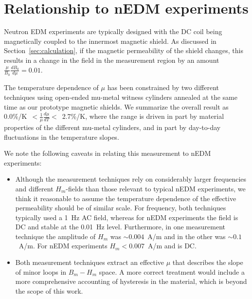 





\section{Relationship to nEDM experiments\label{sec:relationship}}

Neutron EDM experiments are typically designed with the DC coil being
magnetically coupled to the innermost magnetic shield. As discussed in
Section~\ref{sec:calculation}, if the magnetic permeability of the
shield changes, this results in a change in the field in the
measurement region by an amount
$\frac{\mu}{B_0}\frac{dB_0}{d\mu}=0.01$.

The temperature dependence of $\mu$ has been constrained by two
different techniques using open-ended mu-metal witness cylinders
annealed at the same time as our prototype magnetic shields.  We
summarize the overall result as
0.0\%/K~$<\frac{1}{\mu}\frac{d\mu}{dT}<$~2.7\%/K, where the range is
driven in part by material properties of the different mu-metal
cylinders, and in part by day-to-day fluctuations in the temperature
slopes.



We note the following caveats in relating this measurement to nEDM
experiments:
\begin{itemize}
\item Although the measurement techniques rely on considerably larger
  frequencies and different $H_m$-fields than those relevant to
  typical nEDM experiments, we think it reasonable to assume the
  temperature dependence of the effective permeability should be of
  similar scale.  For frequency, both techniques typically used a 1~Hz
  AC field, whereas for nEDM experiments the field is DC and stable at
  the 0.01~Hz level.  Furthermore, in one measurement technique the
  amplitude of $H_m$ was $\sim 0.004$~A/m and in the other was $\sim
  0.1$~A/m.  For nEDM experiments $H_m<0.007$~A/m and is DC.
\item Both measurement techniques extract an effective $\mu$ that
  describes the slope of minor loops in $B_m-H_m$ space.  A more
  correct treatment would include a more comprehensive accounting of
  hysteresis in the material, which is beyond the scope of this work.
\end{itemize}

